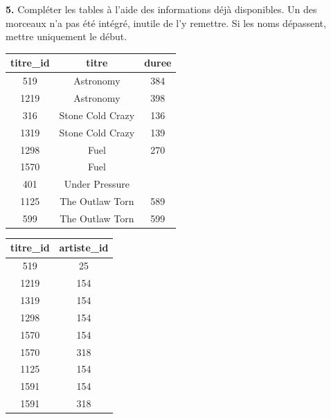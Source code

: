 \documentclass[a4paper,10pt,french]{book}
\begin{document}
    \textbf{5.}	Compléter les tables à l’aide des informations déjà disponibles. Un des morceaux n’a pas été intégré, inutile de l'y remettre. Si les noms dépassent, mettre uniquement le début.
    
    \begin{center}
        \begin{tabular}{|c|c|c|}
            \hline
            \rowcolor{UGLiOrange} \color{white}\textbf{titre\_id} &\color{white}\textbf{titre}&\color{white}\textbf{duree}\\
            \hline
            519 & Astronomy			&\color{red}384 \\
            \hline
            1219 &Astronomy	&\color{red}398 \\
            \hline
            316 & Stone Cold Crazy & 136\\
            \hline
            1319 & Stone Cold Crazy & 139\\
            \hline
            1298	&	\color{red}Fuel		&270\\
            \hline
            1570& \color{red}Fuel& \\
            \hline
            401 & \color{red}Under Pressure& \\
            \hline
            1125 & The Outlaw Torn& 589 \\
            \hline
            599 & The Outlaw Torn &599\\
            \hline
        \end{tabular}\hspace*{2em}
        \begin{tabular}{|c|c|}
            \hline
            \rowcolor{UGLiOrange} \color{white}\textbf{titre\_id} &\color{white}\textbf{artiste\_id}\\
            \hline
            519 & 25		\\
            \hline
            1219 &154	 \\
            \hline
            1319 &\color{red}154 \\
            \hline
            1298 & 154\\
            \hline
            1570	&154\\
            \hline
            1570&  318\\
            \hline
            1125 & 154 \\
            \hline
            1591 & 154\\
            \hline
            1591 & 318\\

\end{tabular}
\end{center}
\end{document}
